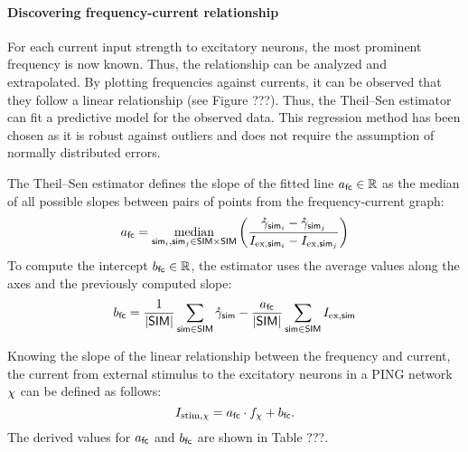 \paragraph{Discovering frequency-current relationship}

For each current input strength to excitatory neurons, the most prominent frequency is now known. Thus, the relationship can be analyzed and extrapolated. By plotting frequencies against currents, it can be observed that they follow a linear relationship (see Figure ???). Thus, the Theil–Sen estimator can fit a predictive model for the observed data. This regression method has been chosen as it is robust against outliers and does not require the assumption of normally distributed errors. 

The Theil–Sen estimator defines the slope of the fitted line $a_\mathsf{fc} \in \mathbb{R}$ as the median of all possible slopes between pairs of points from the frequency-current graph:
\begin{equation}
    a_\mathsf{fc} = \operatorname*{median}_{
        \mathsf{sim}_i, \mathsf{sim}_j \in \mathsf{SIM} \times \mathsf{SIM}
    } \left( 
        \frac{
            \mathring{\gamma}_{\mathsf{sim}_i} - \mathring{\gamma}_{\mathsf{sim}_j}
        }{
            I_{\mathrm{ex}, \mathsf{sim}_i} - I_{\mathrm{ex}, \mathsf{sim}_j}
        } 
    \right)
\end{equation}
To compute the intercept $b_\mathsf{fc} \in \mathbb{R}$, the estimator uses the average values along the axes and the previously computed slope:
\begin{equation}
    b_\mathsf{fc} = 
    \frac{1}{|\mathsf{SIM}|}
    \sum_{\mathsf{sim} \in \mathsf{SIM}}
    \mathring{\gamma}_{\mathsf{sim}}
    -
    \frac{a_\mathsf{fc}}{|\mathsf{SIM}|}
    \sum_{\mathsf{sim} \in \mathsf{SIM}}
    I_{\mathrm{ex}, \mathsf{sim}}
\end{equation}

Knowing the slope of the linear relationship between the frequency and current, the current from external stimulus to the excitatory neurons in a PING network $\chi$ can be defined as follows:
\begin{equation}
    I_{\mathrm{stim}, \chi} = a_\mathsf{fc} \cdot f_\chi + b_\mathsf{fc}.
\end{equation}
The derived values for $a_\mathsf{fc}$ and $b_\mathsf{fc}$ are shown in Table ???.

